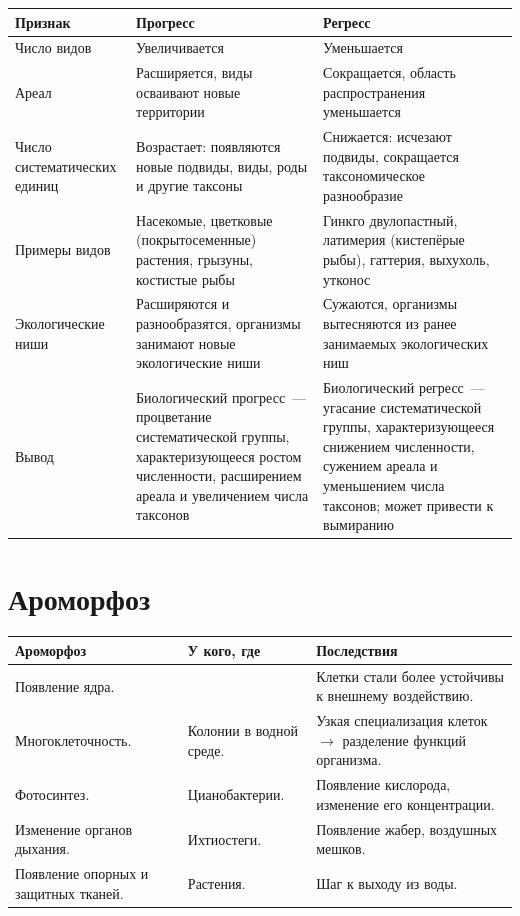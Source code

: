 \documentclass[12pt]{article}
\begin{document}
	\begin{xltabular}{\textwidth}{|X|X|X|}
		\hline
		\textbf{Признак} & \textbf{Прогресс} & \textbf{Регресс}\\
		\hline
		Число видов & Увеличивается & Уменьшается\\
		\hline
		Ареал & Расширяется, виды осваивают новые территории & Сокращается, область распространения уменьшается\\
		\hline
		Число систематических единиц & Возрастает: появляются новые подвиды, виды, роды и другие таксоны & Снижается: исчезают подвиды, сокращается таксономическое разнообразие\\
		\hline
		Примеры видов & Насекомые, цветковые (покрытосеменные) растения, грызуны, костистые рыбы & Гинкго двулопастный, латимерия (кистепёрые рыбы), гаттерия, выхухоль, утконос\\
		\hline
		Экологические ниши & Расширяются и разнообразятся, организмы занимают новые экологические ниши & Сужаются, организмы вытесняются из ранее занимаемых экологических ниш\\
		\hline
		Вывод & Биологический прогресс~--- процветание систематической группы, характеризующееся ростом численности, расширением ареала и увеличением числа таксонов & Биологический регресс~--- угасание систематической группы, характеризующееся снижением численности, сужением ареала и уменьшением числа таксонов; может привести к вымиранию\\
		\hline
	\end{xltabular}
	
	\section{Ароморфоз}
	
	\begin{xltabular}{\textwidth}{|X|X|X|}
		\hline
		\textbf{Ароморфоз} & \textbf{У кого, где} & \textbf{Последствия}\\
		\hline
		Появление ядра. & & Клетки стали более устойчивы к внешнему воздействию.\\
		\hline
		Многоклеточность. & Колонии в водной среде. & Узкая специализация клеток $\rightarrow$ разделение функций организма.\\
		\hline
		Фотосинтез. & Цианобактерии. & Появление кислорода, изменение его концентрации.\\
		\hline
		Изменение органов дыхания. & Ихтиостеги. & Появление жабер, воздушных мешков.\\
		\hline
		Появление опорных и защитных тканей. & Растения. & Шаг к выходу из воды.\\
		\hline
	\end{xltabular}
	
\end{document}
